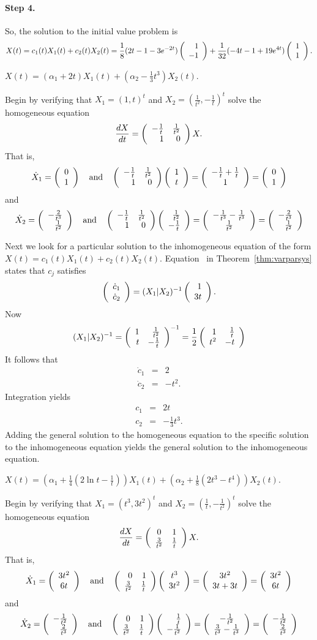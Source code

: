 \documentclass{ximera}
\begin{document}
\paragraph{Step 4.} So, the solution to the initial value problem is
\[
X(t) = c_1(t)X_1(t) + c_2(t)X_2(t)
= \frac{1}{8}(2t - 1 - 3e^{-2t})\left(\begin{array}{r} 1 \\ -1\end{array}\right) +
\frac{1}{32}(-4t - 1 + 19e^{4t})\left(\begin{array}{r} 1 \\ 1\end{array}\right).
\]


 \ans $X(t) = (\alpha_1+2t)X_1(t) + 
\left(\alpha_2-\frac{1}{3}t^3 \right)X_2(t)$.

\soln  Begin by verifying that $X_1=(1,t)^t$ and 
$X_2=(\frac{1}{t^2},-\frac{1}{t})^t$ solve the homogeneous
equation
\[
\frac{dX}{dt}= \left(\begin{array}{rr} -\frac{1}{t} & \frac{1}{t^2}\\ 1 &0\end{array}\right)X.
\]
That is,
\[
\dot{X}_1 = \left(\begin{array}{c} 0 \\ 1\end{array}\right) \quad\mbox{and}\quad 
\left(\begin{array}{rr} -\frac{1}{t} & \frac{1}{t^2}\\ 1 &0\end{array}\right)\left(\begin{array}{c} 1 \\ t\end{array}\right) = 
\left(\begin{array}{c} -\frac{1}{t}+\frac{1}{t} \\ 1\end{array}\right) = \left(\begin{array}{c} 0 \\ 1\end{array}\right)
\]
and 
\[
\dot{X}_2 = \left(\begin{array}{r} -\frac{2}{t^3} \\ \frac{1}{t^2}\end{array}\right) \quad\mbox{and}\quad 
\left(\begin{array}{rr} -\frac{1}{t} & \frac{1}{t^2}\\ 1 &0\end{array}\right)
\left(\begin{array}{r} \frac{1}{t^2} \\ -\frac{1}{t}\end{array}\right) = 
\left(\begin{array}{c} -\frac{1}{t^3}-\frac{1}{t^3} \\ \frac{1}{t^2}\end{array}\right) 
= \left(\begin{array}{r} -\frac{2}{t^3} \\ \frac{1}{t^2}\end{array}\right)
\]

Next we look for a particular solution to the inhomogeneous equation of 
the form $X(t)=c_1(t)X_1(t)+c_2(t)X_2(t)$.  Equation~ in
Theorem~\ref{thm:varparsys} states that $c_j$ satisfies
\[
\left(\begin{array}{r} \dot{c}_1 \\ \dot{c}_2\end{array}\right) = (X_1|X_2)^{-1} \left(\begin{array}{r} 1 \\ 3t\end{array}\right).
\]
Now 
\[
(X_1|X_2)^{-1} = \left(\begin{array}{rr} 1 & \frac{1}{t^2}\\ t &-\frac{1}{t}\end{array}\right)^{-1} = 
\frac{1}{2}\left(\begin{array}{rr} 1 & \frac{1}{t}\\ t^2 &-t\end{array}\right)
\]
It follows that 
\begin{eqnarray*}
\dot{c}_1 & = & 2 \\
\dot{c}_2 & = & -t^2.
\end{eqnarray*}
Integration yields
\begin{eqnarray*} 
c_1 & = & 2t\\
c_2 & = & -\frac{1}{3}t^3.
\end{eqnarray*}
Adding the general solution to the homogeneous equation to the specific
solution to the inhomogeneous equation yields the general solution to the
inhomogeneous equation.


\ans $X(t) = \left(\alpha_1+\frac{1}{4}\left(2\ln t -
\frac{1}{t}\right)\right)X_1(t) + \left(\alpha_2 + \frac{1}{8}
\left(2t^3-t^4\right)\right)X_2(t)$.

\soln  Begin by verifying that $X_1=(t^3,3t^2)^t$ and 
$X_2=(\frac{1}{t},-\frac{1}{t^2})^t$ solve the homogeneous
equation
\[
\frac{dX}{dt}= \left(\begin{array}{cc} 0 & 1\\ \frac{3}{t^2} &\frac{1}{t}\end{array}\right)X.
\]
That is,
\[
\dot{X}_1 = \left(\begin{array}{c} 3t^2 \\ 6t\end{array}\right) \quad\mbox{and}\quad 
\left(\begin{array}{rr} 0 & 1\\ \frac{3}{t^2} &\frac{1}{t}\end{array}\right)\left(\begin{array}{c} t^3 \\ 3t^2\end{array}\right) = 
\left(\begin{array}{c} 3t^2 \\ 3t+3t\end{array}\right) = \left(\begin{array}{c} 3t^2 \\ 6t\end{array}\right)
\]
and 
\[
\dot{X}_2 = \left(\begin{array}{r} -\frac{1}{t^2} \\ \frac{2}{t^3}\end{array}\right) \quad\mbox{and}\quad 
\left(\begin{array}{rr} 0 & 1\\ \frac{3}{t^2} &\frac{1}{t}\end{array}\right)
\left(\begin{array}{r} \frac{1}{t} \\ -\frac{1}{t^2}\end{array}\right) = 
\left(\begin{array}{c} -\frac{1}{t^2} \\ \frac{3}{t^3}-\frac{1}{t^3}\end{array}\right) 
= \left(\begin{array}{r} -\frac{1}{t^2} \\ \frac{2}{t^3}\end{array}\right)
\]
\end{document}
